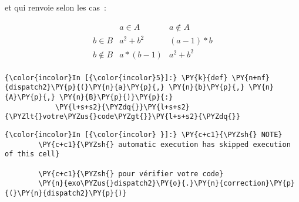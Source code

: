 et qui renvoie selon les cas~:

\[
\begin{array}{c|c|c}
\ & a \in A & a\notin A \\
\hline
b\in B & a^2+b^2 & (a-1)*b\\
\hline
b\notin B & a*(b-1)& a^2+b^2\\
\end{array}
\]

    \begin{Verbatim}[commandchars=\\\{\}]
{\color{incolor}In [{\color{incolor}5}]:} \PY{k}{def} \PY{n+nf}{dispatch2}\PY{p}{(}\PY{n}{a}\PY{p}{,} \PY{n}{b}\PY{p}{,} \PY{n}{A}\PY{p}{,} \PY{n}{B}\PY{p}{)}\PY{p}{:}
            \PY{l+s+s2}{\PYZdq{}}\PY{l+s+s2}{\PYZlt{}votre\PYZus{}code\PYZgt{}}\PY{l+s+s2}{\PYZdq{}}
\end{Verbatim}


    \begin{Verbatim}[commandchars=\\\{\}]
{\color{incolor}In [{\color{incolor} }]:} \PY{c+c1}{\PYZsh{} NOTE}
        \PY{c+c1}{\PYZsh{} automatic execution has skipped execution of this cell}
        
        \PY{c+c1}{\PYZsh{} pour vérifier votre code}
        \PY{n}{exo\PYZus{}dispatch2}\PY{o}{.}\PY{n}{correction}\PY{p}{(}\PY{n}{dispatch2}\PY{p}{)}
\end{Verbatim}



    
    
    
